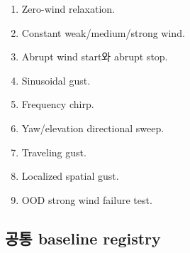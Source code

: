 \documentclass[11pt,a4paper]{article}
\begin{document}
\begin{enumerate}[leftmargin=1.7em]
  \item Zero-wind relaxation.
  \item Constant weak/medium/strong wind.
  \item Abrupt wind start와 abrupt stop.
  \item Sinusoidal gust.
  \item Frequency chirp.
  \item Yaw/elevation directional sweep.
  \item Traveling gust.
  \item Localized spatial gust.
  \item OOD strong wind failure test.
\end{enumerate}

\subsection{공통 baseline registry}
\end{document}
